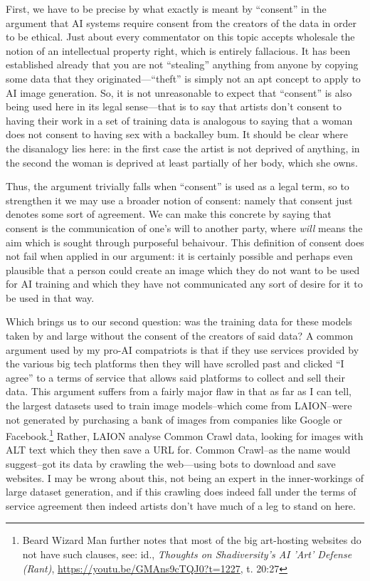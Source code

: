 \documentclass[11pt]{article}
\begin{document}
First, we have to be precise by what exactly is meant by ``consent'' in the argument that AI systems require consent from the creators of the data in order to be ethical. Just about every commentator on this topic accepts wholesale the notion of an intellectual property right, which is entirely fallacious. It has been established already that you are not ``stealing'' anything from anyone by copying some data that they originated---``theft'' is simply not an apt concept to apply to AI image generation. So, it is not unreasonable to expect that ``consent'' is also being used here in its legal sense---that is to say that artists don't consent to having their work in a set of training data is analogous to saying that a woman does not consent to having sex with a backalley bum. It should be clear where the disanalogy lies here: in the first case the artist is not deprived of anything, in the second the woman is deprived at least partially of her body, which she owns.

Thus, the argument trivially falls when ``consent'' is used as a legal term, so to strengthen it we may use a broader notion of consent: namely that consent just denotes some sort of agreement. We can make this concrete by saying that consent is the communication of one's will to another party, where \emph{will} means the aim which is sought through purposeful behaivour. This definition of consent does not fail when applied in our argument: it is certainly possible and perhaps even plausible that a person could create an image which they do not want to be used for AI training and which they have not communicated any sort of desire for it to be used in that way.

Which brings us to our second question: was the training data for these models taken by and large without the consent of the creators of said data? A common argument used by my pro-AI compatriots is that if they use services provided by the various big tech platforms then they will have scrolled past and clicked ``I agree'' to a terms of service that allows said platforms to collect and sell their data. This argument suffers from a fairly major flaw in that as far as I can tell, the largest datasets used to train image models--which come from LAION--were not generated by purchasing a bank of images from companies like Google or Facebook.\footnote{Beard Wizard Man further notes that most of the big art-hosting websites do not have such clauses, see: id., \emph{Thoughts on Shadiversity's AI 'Art' Defense (Rant)}, \url{https://youtu.be/GMAns9cTQJ0?t=1227}, t. 20:27} Rather, LAION analyse Common Crawl data, looking for images with ALT text which they then save a URL for. Common Crawl--as the name would suggest--got its data by crawling the web---using bots to download and save websites. I may be wrong about this, not being an expert in the inner-workings of large dataset generation, and if this crawling does indeed fall under the terms of service agreement then indeed artists don't have much of a leg to stand on here.
\end{document}
